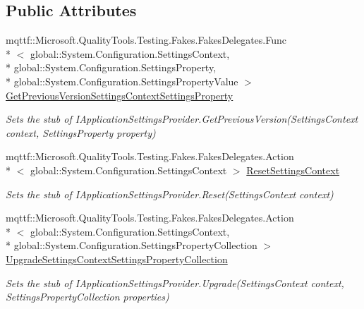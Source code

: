 \subsection*{Public Attributes}
\begin{DoxyCompactItemize}
\item 
mqttf\-::\-Microsoft.\-Quality\-Tools.\-Testing.\-Fakes.\-Fakes\-Delegates.\-Func\\*
$<$ global\-::\-System.\-Configuration.\-Settings\-Context, \\*
global\-::\-System.\-Configuration.\-Settings\-Property, \\*
global\-::\-System.\-Configuration.\-Settings\-Property\-Value $>$ \hyperlink{class_system_1_1_configuration_1_1_fakes_1_1_stub_i_application_settings_provider_a7a78d8d8704df1af01991eb40a30425b}{Get\-Previous\-Version\-Settings\-Context\-Settings\-Property}
\begin{DoxyCompactList}\small\item\em Sets the stub of I\-Application\-Settings\-Provider.\-Get\-Previous\-Version(\-Settings\-Context context, Settings\-Property property)\end{DoxyCompactList}\item 
mqttf\-::\-Microsoft.\-Quality\-Tools.\-Testing.\-Fakes.\-Fakes\-Delegates.\-Action\\*
$<$ global\-::\-System.\-Configuration.\-Settings\-Context $>$ \hyperlink{class_system_1_1_configuration_1_1_fakes_1_1_stub_i_application_settings_provider_a83db59848e7ec82cdedc16f9573b5255}{Reset\-Settings\-Context}
\begin{DoxyCompactList}\small\item\em Sets the stub of I\-Application\-Settings\-Provider.\-Reset(\-Settings\-Context context)\end{DoxyCompactList}\item 
mqttf\-::\-Microsoft.\-Quality\-Tools.\-Testing.\-Fakes.\-Fakes\-Delegates.\-Action\\*
$<$ global\-::\-System.\-Configuration.\-Settings\-Context, \\*
global\-::\-System.\-Configuration.\-Settings\-Property\-Collection $>$ \hyperlink{class_system_1_1_configuration_1_1_fakes_1_1_stub_i_application_settings_provider_ac103e4052676e95928b22cf893ad3f9c}{Upgrade\-Settings\-Context\-Settings\-Property\-Collection}
\begin{DoxyCompactList}\small\item\em Sets the stub of I\-Application\-Settings\-Provider.\-Upgrade(\-Settings\-Context context, Settings\-Property\-Collection properties)\end{DoxyCompactList}\end{DoxyCompactItemize}


